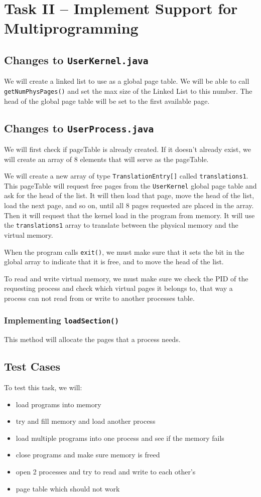 \documentclass[12pt, letterpaper]{report}
\newcommand{\code}[1]{\texttt{#1}}
\begin{document}
\section*{Task II -- Implement Support for Multiprogramming}
\subsection*{Changes to \code{UserKernel.java}}
We will create a linked list to use as a global page table.
We will be able to call \code{getNumPhysPages()}
and set the max size of the Linked List to this number.
The head of the global page table will be set to the first available page.

\subsection*{Changes to \code{UserProcess.java}}
We will first check if pageTable is already created.
If it doesn't already exist,
we will create an array of 8 elements that will serve as the pageTable.

We will create a new array of type \code{TranslationEntry[]}
called \code{translations1}.
This pageTable will request free pages from the \code{UserKernel}
global page table and ask for the head of the list.
It will then load that page, move the head of the list,
load the next page, and so on, until all 8 pages requested
are placed in the array.
Then it will request that the kernel load in the program from memory.
It will use the \code{translations1} array to translate between the physical memory and the virtual memory.

When the program calls \code{exit()},
we must make sure that it sets the bit in the global array
to indicate that it is free,
and to move the head of the list.

To read and write virtual memory,
we must make sure we check the PID of the requesting process
and check which virtual pages it belongs to,
that way a process can not read from or write to another processes table.

\subsubsection*{Implementing \code{loadSection()}}
This method will allocate the pages that a process needs.

\subsection*{Test Cases}
To test this task, we will:
\begin{itemize}
\item load programs into memory
\item try and fill memory and load another process
\item load multiple programs into one process and see if the memory fails
\item close programs and make sure memory is freed
\item open 2 processes and try to read and write to each other's
\item page table which should not work
\end{itemize}
\clearpage
\end{document}
